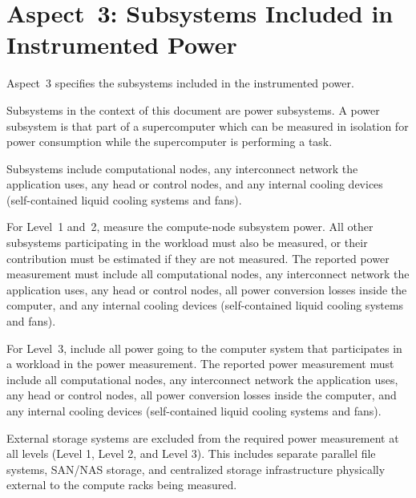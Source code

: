 
\section{Aspect~3: Subsystems Included in Instrumented Power}
\label{sec:A3SIiIP}

Aspect~3 specifies the subsystems included in the instrumented power.

Subsystems in the context of this document are power subsystems.
A power subsystem is that part of a supercomputer which can be measured in isolation for power consumption while the supercomputer is performing a task.

Subsystems include computational nodes, any interconnect network the application uses, any head or control nodes, and any internal cooling devices (self-contained liquid cooling systems and fans).

For Level~1 and~2, measure the compute-node subsystem power.
All other subsystems participating in the workload must also be measured, or their contribution must be estimated if they are not measured.
The reported power measurement must include all computational nodes, any interconnect network the application uses, any head or control nodes, all power conversion losses inside the computer, and any internal cooling devices (self-contained liquid cooling systems and fans).

For Level~3, include all power going to the computer system that participates in a workload in the power measurement.
The reported power measurement must include all computational nodes, any interconnect network the application uses, any head or control nodes, all power conversion losses inside the computer, and any internal cooling devices (self-contained liquid cooling systems and fans).

External storage systems are excluded from the required power measurement at all levels (Level 1, Level 2, and Level 3).
This includes separate parallel file systems, SAN/NAS storage, and centralized storage infrastructure physically external to the compute racks being measured. 

